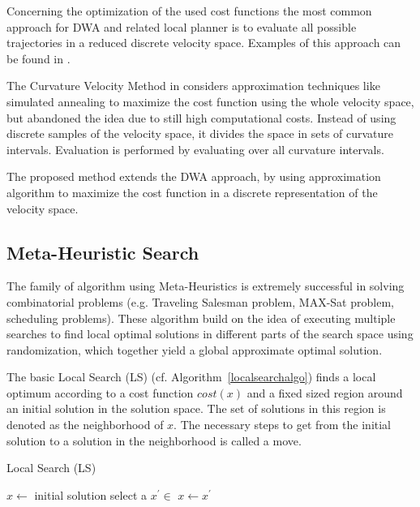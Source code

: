 Concerning the optimization of the used cost functions the most common approach for DWA and related local planner is to evaluate all possible trajectories in a reduced discrete velocity space. 
Examples of this approach can be found in \cite{kiss2012advanced}\cite{DBLP:conf/icra/Marder-EppsteinBFGK10}\cite{conf/icra/SederP07}. 

The Curvature Velocity Method in \cite{simmons1996curvature} considers approximation techniques like simulated annealing to maximize the cost function using the whole velocity space, but abandoned the idea due to still high computational costs. 
Instead of using discrete samples of the velocity space, it divides the space in sets of curvature intervals. 
Evaluation is performed by evaluating over all curvature intervals.

The proposed method extends the DWA approach, by using approximation algorithm to maximize the cost function in a discrete representation of the velocity space.

\subsection{Meta-Heuristic Search}
The family of algorithm using Meta-Heuristics is extremely successful in solving combinatorial problems (e.g. Traveling Salesman problem, MAX-Sat problem, scheduling problems). 
These algorithm build on the idea of executing multiple searches to find local optimal solutions in different parts of the search space using randomization, which together yield a global approximate optimal solution.

The basic Local Search (LS) (cf. Algorithm~\ref{localsearchalgo}) finds a local optimum according to a cost function $cost(x)$ and a fixed sized region around an initial solution in the solution space. 
The set of solutions in this region is denoted as the neighborhood of $x$. The necessary steps to get from the initial solution to a solution in the neighborhood is called a move.
\begin{algorithm}
\caption{Local Search  (LS)}
\label{localsearchalgo}
\begin{algorithmic} 
\State $x\gets$ initial solution
\Repeat
\State select a $x^\prime \in$ 
    \State $x\gets x^\prime$
\EndIf
{}
\end{algorithmic}
\end{algorithm}

